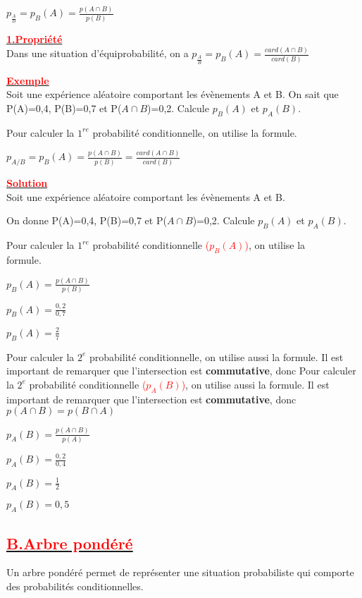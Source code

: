 \documentclass[12pt,a4paper]{article}
\begin{document}
$p_{\frac{A}{B}}=p_{B}(A)=\frac{p(A\cap B)}{p(B)}$

\underline{\textbf{\textcolor{red}{1.Propriété}}}\\
Dans une situation d’équiprobabilité, on a $p_{\frac{A}{B}}=p_{B}(A)=\frac{card(A\cap B)}{card(B)}$

\underline{\textbf{\textcolor{red}{Exemple}}}\\
Soit une expérience aléatoire comportant les évènements A et B. On sait que
P(A)=0,4,  P(B)=0,7 et P($A\cap B$)=0,2. Calcule $p_{B}(A)$ et $p_{A}(B)$.

Pour calculer la $1^{re}$ probabilité conditionnelle, on utilise la formule.

$p_{A/B}=p_{B}(A)=\frac{p(A\cap B)}{p(B)}=\frac{card(A\cap B)}{card(B)}$

\underline{\textbf{\textcolor{red}{Solution}}}\\
Soit une expérience aléatoire comportant les évènements A et B.

On donne
P(A)=0,4,  P(B)=0,7 et P($A\cap B$)=0,2. Calcule $p_{B}(A)$ et $p_{A}(B)$.

Pour calculer la $1^{re}$ probabilité conditionnelle  \textcolor{red}{($p_{B}(A)$)}, on utilise la\\ formule.

$p_{B}(A)=\frac{p(A\cap B)}{p(B)}$

$p_{B}(A)=\frac{0,2}{0,7}$

$p_{B}(A)=\frac{2}{7}$

Pour calculer la $2^{e}$ probabilité conditionnelle, on utilise aussi la formule. Il est important de remarquer que l’intersection est \textbf{commutative}, donc 
Pour calculer la $2^{e}$ probabilité conditionnelle \textcolor{red}{($p_{A}(B)$)}, on utilise aussi la formule. Il est important de remarquer que l’intersection est \textbf{commutative}, donc 
$p(A\cap B)=p(B\cap A)$

$p_{A}(B)=\frac{p(A\cap B)}{p(A)}$

$p_{A}(B)=\frac{0,2}{0,4}$

$p_{A}(B)=\frac{1}{2}$

$p_{A}(B)=0,5$
\subsection*{\underline{\textbf{\textcolor{red}{B.Arbre pondéré}}}}
Un arbre pondéré permet de représenter une situation probabiliste qui comporte des probabilités conditionnelles.
\end{document}
